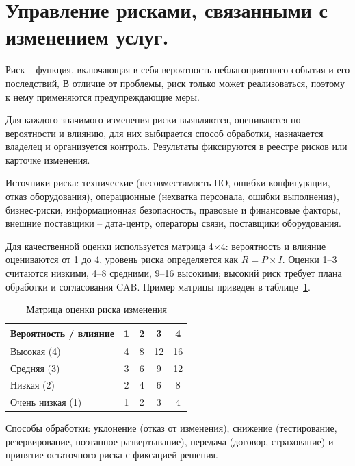 \documentclass[14pt,a4paper]{extarticle}
\begin{document}
\section{Управление рисками, связанными с изменением услуг.}

Риск -- функция, включающая в себя вероятность неблагоприятного события и его последствий,
В отличие от проблемы, риск только может реализоваться, поэтому к нему применяются предупреждающие меры.

Для каждого значимого изменения риски выявляются, оцениваются по вероятности и
влиянию, для них выбирается способ обработки, назначается владелец и организуется
контроль. Результаты фиксируются в реестре рисков или карточке изменения.

Источники риска: технические (несовместимость ПО, ошибки конфигурации, отказ
оборудования), операционные (нехватка персонала, ошибки выполнения),
бизнес-риски, информационная безопасность, правовые и финансовые факторы,
внешние поставщики -- дата-центр, операторы связи, поставщики оборудования.

Для качественной оценки используется матрица 4$\times$4: вероятность и влияние
оцениваются от 1 до 4, уровень риска определяется как $R = P \times I$. Оценки
1--3 считаются низкими, 4--8 средними, 9--16 высокими; высокий риск требует плана
обработки и согласования CAB. Пример матрицы приведен в таблице~\ref{tab:risk}.

\begin{table}[H]
    \centering
    \caption{Матрица оценки риска изменения}
    \label{tab:risk}
    \small
    \begin{tabular}{|l|c|c|c|c|}
        \hline
        \textbf{Вероятность / влияние} & \textbf{1} & \textbf{2} &
        \textbf{3} & \textbf{4} \\
        \hline
        Высокая (4) & 4 & 8 & 12 & 16 \\
        \hline
        Средняя (3) & 3 & 6 & 9 & 12 \\
        \hline
        Низкая (2) & 2 & 4 & 6 & 8 \\
        \hline
        Очень низкая (1) & 1 & 2 & 3 & 4 \\
        \hline
    \end{tabular}
\end{table}

Способы обработки: уклонение (отказ от изменения), снижение (тестирование,
резервирование, поэтапное развертывание), передача (договор, страхование) и
принятие остаточного риска с фиксацией решения.
\end{document}
